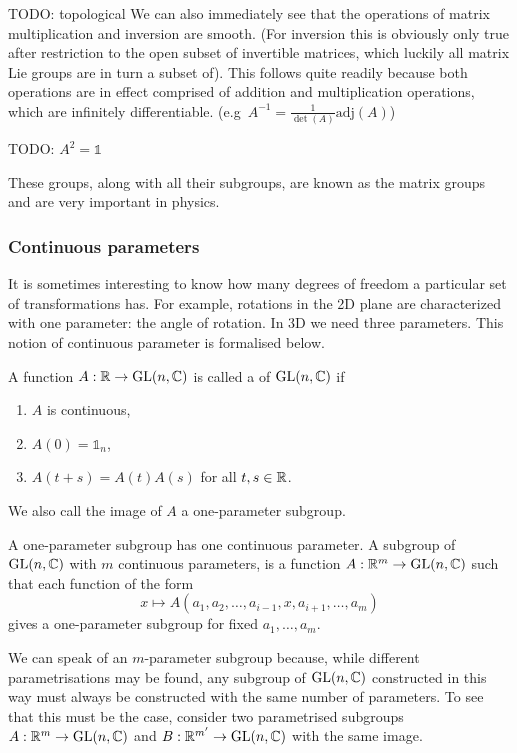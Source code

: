 TODO: topological
We can also immediately see that the operations of matrix multiplication and inversion are smooth. (For inversion this is obviously only true after restriction to the open subset of invertible matrices, which luckily all matrix Lie groups are in turn a subset of). This follows quite readily because both operations are in effect comprised of addition and multiplication operations, which are infinitely differentiable. (e.g\ $A^{-1} = \frac{1}{\det(A)}\mathrm{adj}(A)$)

\begin{example}
TODO: $A^2 = \mathbb{1}$
\end{example}

These groups, along with all their subgroups, are known as the matrix groups and are very important in physics.

\subsubsection{Continuous parameters}
It is sometimes interesting to know how many degrees of freedom a particular set of transformations has. For example, rotations in the 2D plane are characterized with one parameter: the angle of rotation. In 3D we need three parameters. This notion of continuous parameter is formalised below.

\begin{definition}
A function $A : \mathbb{R} \to \operatorname{GL}(n, \mathbb{C})$ is called a  of $\operatorname{GL}(n, \mathbb{C})$ if
\begin{enumerate}
\item $A$ is continuous,
\item $A(0) = \mathbb{1}_n$,
\item $A(t+s) = A(t)A(s)$ for all $t,s \in \mathbb{R}$.
\end{enumerate}
We also call the image of $A$ a one-parameter subgroup.
\end{definition}

A one-parameter subgroup has one continuous parameter. A subgroup of $\operatorname{GL}(n, \mathbb{C})$ with $m$ continuous parameters, is a function $A : \mathbb{R}^m \to \operatorname{GL}(n, \mathbb{C})$ such that each function of the form
\[ x \mapsto A(a_1, a_2, \ldots , a_{i-1}, x, a_{i+1}, \ldots, a_m) \]
gives a one-parameter subgroup for fixed $a_1,\ldots, a_m$.

We can speak of an $m$-parameter subgroup because, while different parametrisations may be found, any subgroup of $\operatorname{GL}(n,\mathbb{C})$ constructed in this way must always be constructed with the same number of parameters. To see that this must be the case, consider two parametrised subgroups $A : \mathbb{R}^m \to \operatorname{GL}(n, \mathbb{C})$ and $B : \mathbb{R}^{m'} \to \operatorname{GL}(n, \mathbb{C})$ with the same image.

